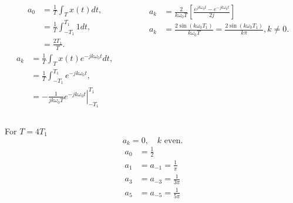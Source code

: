 \begin{frame}
    {
        \begin{columns}
          \begin{column}{0.5\textwidth}
                \begin{equation*}
                    \begin{split}
                       a_0 &= \frac{1}{T} \int_{T}x(t)dt,\\
                       &=  \frac{1}{T} \int_{-T_1}^{T_1}1dt,\\
                       &= \frac{2T_1}{T}.
                    \end{split}
                \end{equation*}
                \pause
                \begin{equation*}
                    \begin{split}
                       a_k &= \frac{1}{T} \int_{T}x(t)e^{-jk\omega_0 t}dt,\\
                       &=  \frac{1}{T} \int_{-T_1}^{T_1}e^{-jk\omega_0 t},\\
                       &= -\left. \frac{1}{jk\omega_0 T}e^{-jk\omega_0 t}\right|^{T_1}_{-T_1}
                    \end{split}
                \end{equation*}
          \end{column}
          \begin{column}{0.5\textwidth}
                \pause
                \begin{equation*}
                    \begin{split}
                       a_k &= \frac{2}{k\omega_0 T}\left[\frac{e^{jk\omega_0 t} - e^{-jk\omega_0 t}}{2j}\right]\\
                       a_k &= \frac{2\sin(k\omega_0 T_1)}{k\omega_0 T} = \frac{2\sin(k\omega_0 T_1)}{k\pi}, k \neq 0.
                    \end{split}
                \end{equation*}
          \end{column}
        \end{columns}
    }
\end{frame}

\begin{frame}
    {
    For $T=4T_1$
    \begin{equation*}
        a_k = 0, \quad k \text{ even}.
    \end{equation*}
    \begin{align*}
        a_0 &= \frac{1}{2}\\
        a_1 &= a_{-1} = \frac{1}{\pi}\\
        a_3 &= a_{-3} = \frac{1}{3\pi}\\
        a_5 &= a_{-5} = \frac{1}{5\pi}\\
    \end{align*}
    }
\end{frame}


